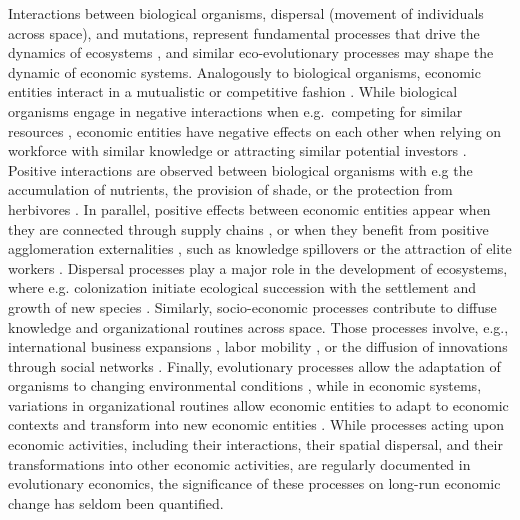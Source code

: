   Interactions between biological organisms, dispersal (movement of individuals across space), and mutations, represent fundamental processes that drive the dynamics of ecosystems \citep{Vellend2010}, and similar eco-evolutionary processes may shape the dynamic of economic systems.
  Analogously to biological organisms, economic entities interact in a mutualistic or competitive fashion \citep{Pistorius1997}. While biological organisms engage in negative interactions when e.g.~competing for similar resources \citep{GRIME1973}, economic entities have negative effects on each other when relying on workforce with similar knowledge or attracting similar potential investors \citep{Wernerfelt1989}.
  Positive interactions are observed between biological organisms with e.g the accumulation of nutrients, the provision of shade, or the protection from herbivores \citep{Callaway2002}. In parallel, positive effects between economic entities appear when they are connected through supply chains \citep{Ozman2009,Saavedra2009a}, or when they benefit from positive agglomeration externalities \citep{VanDerPanne2004}, such as knowledge spillovers \citep{Caragliu2016} or the attraction of elite workers \citep{Cohendet2018}.
  Dispersal processes play a major role in the development of ecosystems, where e.g. colonization initiate ecological succession with the settlement and growth of new species \citep{Leibold2004}. Similarly, socio-economic processes contribute to diffuse knowledge and organizational routines across space. Those processes involve, e.g., international business expansions \citep{Andersen1993,Zahra2000,Luo2007}, labor mobility \citep{Boschma2008}, or the diffusion of innovations through social networks \citep{RogersEverettM2003DoI,Keller2004,Bahar2014a}.
  Finally, evolutionary processes allow the adaptation of organisms to changing environmental conditions \citep{Bell2017}, while in economic systems, variations in organizational routines allow economic entities to adapt to economic contexts \citep{Cordes2006} and transform into new economic entities \citep{Freeman2002,Hodgson2004,Aldrich2008}. %
  While processes acting upon economic activities, including their interactions, their spatial dispersal, and their transformations into other economic activities, are regularly documented in evolutionary economics, the significance of these processes on long-run economic change has seldom been quantified.%

